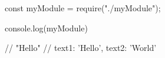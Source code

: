 const myModule = require("./myModule");

console.log(myModule)


// "Hello"
// { text1: 'Hello', text2: 'World' }